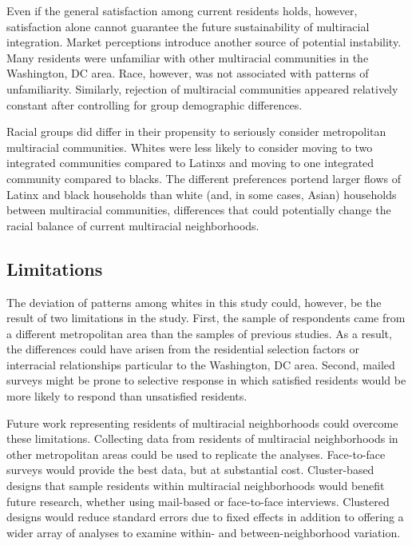 \documentclass{baderart}
\begin{document}
Even if the general satisfaction among current residents holds, however, satisfaction alone cannot guarantee the future sustainability of multiracial integration. Market perceptions introduce another source of potential instability. Many residents were unfamiliar with other multiracial communities in the Washington, DC area. Race, however, was not associated with patterns of unfamiliarity. Similarly, rejection of multiracial communities appeared relatively constant after controlling for group demographic differences. 

Racial groups did differ in their propensity to seriously consider metropolitan multiracial communities. Whites were less likely to consider moving to two integrated communities compared to Latinxs and moving to one integrated community compared to blacks. The different preferences portend larger flows of Latinx and black households than white (and, in some cases, Asian) households between multiracial communities, differences that could potentially change the racial balance of current multiracial neighborhoods. 

\subsection{Limitations}
The deviation of patterns among whites in this study could, however, be the result of two limitations in the study. First, the sample of respondents came from a different metropolitan area than the samples of previous studies. As a result, the differences could have arisen from the residential selection factors or interracial relationships particular to the Washington, DC area. Second, mailed surveys might be prone to selective response in which satisfied residents would be more likely to respond than unsatisfied residents. 

Future work representing residents of multiracial neighborhoods could overcome these limitations. Collecting data from residents of multiracial neighborhoods in other metropolitan areas could be used to replicate the analyses. Face-to-face surveys would provide the best data, but at substantial cost. Cluster-based designs that sample residents within multiracial neighborhoods would benefit future research, whether using mail-based or face-to-face interviews. Clustered designs would reduce standard errors due to fixed effects in addition to offering a wider array of analyses to examine within- and between-neighborhood variation.
\end{document}
